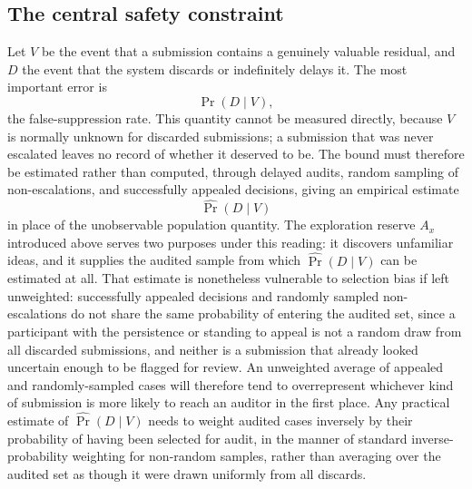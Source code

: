 \documentclass[11pt]{article}
\begin{document}
\subsection{The central safety constraint}

Let $V$ be the event that a submission contains a genuinely valuable residual, and $D$ the event that the system discards or indefinitely delays it. The most important error is
\[
\Pr(D \mid V),
\]
the false-suppression rate. This quantity cannot be measured directly, because $V$ is normally unknown for discarded submissions; a submission that was never escalated leaves no record of whether it deserved to be. The bound must therefore be estimated rather than computed, through delayed audits, random sampling of non-escalations, and successfully appealed decisions, giving an empirical estimate
\[
\widehat{\Pr}(D \mid V)
\]
in place of the unobservable population quantity. The exploration reserve $A_x$ introduced above serves two purposes under this reading: it discovers unfamiliar ideas, and it supplies the audited sample from which $\widehat{\Pr}(D \mid V)$ can be estimated at all. That estimate is nonetheless vulnerable to selection bias if left unweighted: successfully appealed decisions and randomly sampled non-escalations do not share the same probability of entering the audited set, since a participant with the persistence or standing to appeal is not a random draw from all discarded submissions, and neither is a submission that already looked uncertain enough to be flagged for review. An unweighted average of appealed and randomly-sampled cases will therefore tend to overrepresent whichever kind of submission is more likely to reach an auditor in the first place. Any practical estimate of $\widehat{\Pr}(D \mid V)$ needs to weight audited cases inversely by their probability of having been selected for audit, in the manner of standard inverse-probability weighting for non-random samples, rather than averaging over the audited set as though it were drawn uniformly from all discards.
\end{document}
